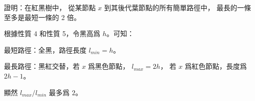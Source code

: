 \startEXERCISE
證明：在紅黑樹中，
從某節點 $x$ 到其後代葉節點的所有簡單路徑中，
最長的一條至多是最短一條的 2 倍。
\stopEXERCISE

\startANSWER
根據性質 4 和性質 5，令黑高爲 $h$。可知：

最短路徑：全黑，路徑長度 $l_{min}=h$。

最長路徑：黑紅交替，若 $x$ 爲黑色節點， $l_{max}=2h$，
若 $x$ 爲紅色節點，長度爲 $2h-1$。

顯然 $l_{max}/l_{min}$ 最多爲 $2$。
\stopANSWER
